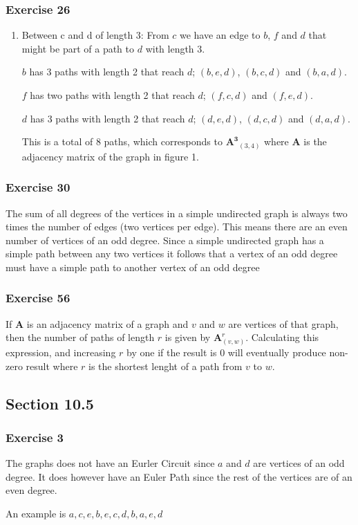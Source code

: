 \documentclass[a4paper]{article}
\newcommand{\ex}[1]{\subsubsection*{#1}}
\begin{document}
\ex{Exercise 26}

\begin{enumerate}[label=\alph*), start=2] %
    \item Between c and d of length 3:
        From \(c\) we have an edge to \(b\), \(f\) and \(d\) that might be part
        of a path to \(d\) with length 3. 
        
        \(b\) has 3 paths with length 2 that reach \(d\); \((b, e, d)\), \((b, c,
            d)\)  and \((b, a, d)\).

        \(f\) has two paths with length 2 that reach \(d\); \((f, c, d)\) and
            \((f, e, d)\).

        \(d\) has 3 paths with length 2 that reach \(d\); \((d, e, d)\), \((d, c,
            d)\)  and \((d, a, d)\).

        This is a total of 8 paths, which corresponds to \(\bm{A^3}_{(3,4)}\)
            where \(\bm{A}\) is the adjacency matrix of the graph in figure 1.
\end{enumerate}

\ex{Exercise 30}

The sum of all degrees of the vertices in a simple undirected graph is always
    two times the number of edges (two vertices per edge). This means there are
    an even number of vertices of an odd degree. Since a simple undirected
    graph has a simple path between any two vertices it follows that a vertex
    of an odd degree must have a simple path to another vertex of an odd degree

\ex{Exercise 56}

If \(\bm{A}\) is an adjacency matrix of a graph and \(v\) and \(w\) are
    vertices of that graph, then the number of paths of length \(r\) is given
    by \(\bm{A}^r_{(v, w)}\). Calculating this expression, and increasing \(r\)
    by one if the result is 0 will eventually produce non-zero result where
    \(r\) is the shortest lenght of a path from \(v\) to \(w\).

\subsection*{Section 10.5}

\ex{Exercise 3}

The graphs does not have an Eurler Circuit since \(a\) and \(d\) are vertices
    of an odd degree. It does however have an Euler Path since the rest of the
    vertices are of an even degree.

An example is \(a, c, e, b, e, c, d, b, a, e, d\)
\end{document}
